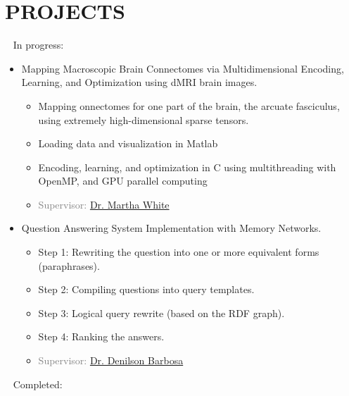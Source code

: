 \section{PROJECTS}
\vspace{0.3em}
\textcolor{red}{\faSpinner} ~ In progress:
	\begin{itemize}
		\item Mapping Macroscopic Brain Connectomes via
		Multidimensional Encoding, Learning, and Optimization using dMRI brain images.
		\begin{itemize}
			\item Mapping onnectomes for one
			part of the brain, the arcuate fasciculus, using extremely high-dimensional sparse tensors.
			\item Loading data and visualization in Matlab
			\item Encoding, learning, and optimization in C using multithreading with OpenMP, and GPU parallel computing
			\item \textcolor{gray}{Supervisor: \href{http://webdocs.cs.ualberta.ca/~whitem/}{Dr. Martha White}}
			
		\end{itemize}
		
		\item Question Answering System Implementation with Memory Networks.
		\begin{itemize}
			\item Step 1: Rewriting the question into one or more 
			equivalent forms (paraphrases).
			\item Step 2: Compiling questions into query templates.
			\item Step 3: Logical query rewrite (based on the
			RDF graph).
			\item Step 4: Ranking the answers.
			\item \textcolor{gray}{Supervisor: \href{https://sites.ualberta.ca/~denilson/}{Dr. Denilson Barbosa}}
		\end{itemize}
		
	\end{itemize}
	\vspace{0.3em}
	\textcolor{darkgreen}{\faCheckSquareO} ~ Completed:
